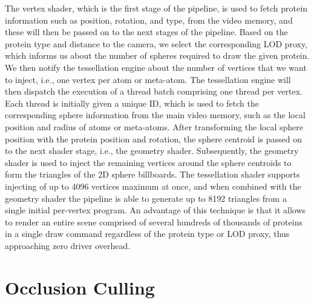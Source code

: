 The vertex shader, which is the first stage of the pipeline, is used to fetch protein information such as position, rotation, and type, from the video memory, and these will then be passed on to the next stages of the pipeline.
Based on the protein type and distance to the camera, we select the corresponding LOD proxy, which informs us about the number of spheres required to draw the given protein.
We then notify the tessellation engine about the number of vertices that we want to inject, i.e., one vertex per atom or meta-atom.
The tessellation engine will then dispatch the execution of a thread batch comprising one thread per vertex.
Each thread is initially given a unique ID, which is used to fetch the corresponding sphere information from the main video memory, such as the local position and radius of atoms or meta-atoms.
After transforming the local sphere position with the protein position and rotation, the sphere centroid is passed on to the next shader stage, i.e., the geometry shader.
Subsequently, the geometry shader is used to inject the remaining vertices around the sphere centroids to form the triangles of the 2D sphere billboards.
The tessellation shader supports injecting of up to 4096 vertices maximum at once, and when combined with the geometry shader the pipeline is able to generate up to 8192 triangles from a single initial per-vertex program.
An advantage of this technique is that it allows to render an entire scene comprised of several hundreds of thousands of proteins in a single draw command regardless of the protein type or LOD proxy, thus approaching zero driver overhead.


\section{Occlusion Culling}


